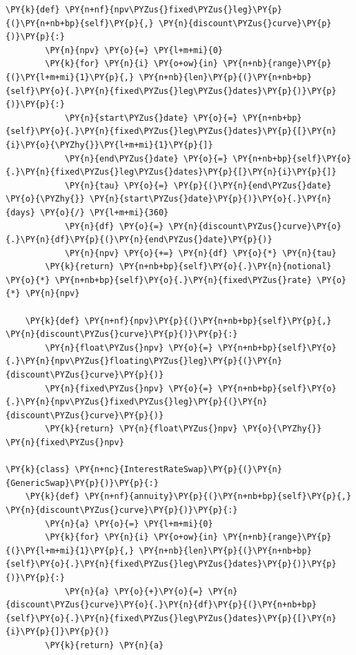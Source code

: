 \begin{tcolorbox}[breakable, size=fbox, boxrule=1pt, pad at break*=1mm,colback=cellbackground, colframe=cellborder]
\begin{Verbatim}[commandchars=\\\{\}]
    \PY{k}{def} \PY{n+nf}{npv\PYZus{}fixed\PYZus{}leg}\PY{p}{(}\PY{n+nb+bp}{self}\PY{p}{,} \PY{n}{discount\PYZus{}curve}\PY{p}{)}\PY{p}{:}
        \PY{n}{npv} \PY{o}{=} \PY{l+m+mi}{0}
        \PY{k}{for} \PY{n}{i} \PY{o+ow}{in} \PY{n+nb}{range}\PY{p}{(}\PY{l+m+mi}{1}\PY{p}{,} \PY{n+nb}{len}\PY{p}{(}\PY{n+nb+bp}{self}\PY{o}{.}\PY{n}{fixed\PYZus{}leg\PYZus{}dates}\PY{p}{)}\PY{p}{)}\PY{p}{:}
            \PY{n}{start\PYZus{}date} \PY{o}{=} \PY{n+nb+bp}{self}\PY{o}{.}\PY{n}{fixed\PYZus{}leg\PYZus{}dates}\PY{p}{[}\PY{n}{i}\PY{o}{\PYZhy{}}\PY{l+m+mi}{1}\PY{p}{]}
            \PY{n}{end\PYZus{}date} \PY{o}{=} \PY{n+nb+bp}{self}\PY{o}{.}\PY{n}{fixed\PYZus{}leg\PYZus{}dates}\PY{p}{[}\PY{n}{i}\PY{p}{]}
            \PY{n}{tau} \PY{o}{=} \PY{p}{(}\PY{n}{end\PYZus{}date} \PY{o}{\PYZhy{}} \PY{n}{start\PYZus{}date}\PY{p}{)}\PY{o}{.}\PY{n}{days} \PY{o}{/} \PY{l+m+mi}{360}
            \PY{n}{df} \PY{o}{=} \PY{n}{discount\PYZus{}curve}\PY{o}{.}\PY{n}{df}\PY{p}{(}\PY{n}{end\PYZus{}date}\PY{p}{)}
            \PY{n}{npv} \PY{o}{+=} \PY{n}{df} \PY{o}{*} \PY{n}{tau}
        \PY{k}{return} \PY{n+nb+bp}{self}\PY{o}{.}\PY{n}{notional} \PY{o}{*} \PY{n+nb+bp}{self}\PY{o}{.}\PY{n}{fixed\PYZus{}rate} \PY{o}{*} \PY{n}{npv}
	
    \PY{k}{def} \PY{n+nf}{npv}\PY{p}{(}\PY{n+nb+bp}{self}\PY{p}{,} \PY{n}{discount\PYZus{}curve}\PY{p}{)}\PY{p}{:}
        \PY{n}{float\PYZus{}npv} \PY{o}{=} \PY{n+nb+bp}{self}\PY{o}{.}\PY{n}{npv\PYZus{}floating\PYZus{}leg}\PY{p}{(}\PY{n}{discount\PYZus{}curve}\PY{p}{)}
        \PY{n}{fixed\PYZus{}npv} \PY{o}{=} \PY{n+nb+bp}{self}\PY{o}{.}\PY{n}{npv\PYZus{}fixed\PYZus{}leg}\PY{p}{(}\PY{n}{discount\PYZus{}curve}\PY{p}{)}
        \PY{k}{return} \PY{n}{float\PYZus{}npv} \PY{o}{\PYZhy{}} \PY{n}{fixed\PYZus{}npv}
	
\PY{k}{class} \PY{n+nc}{InterestRateSwap}\PY{p}{(}\PY{n}{GenericSwap}\PY{p}{)}\PY{p}{:}        
    \PY{k}{def} \PY{n+nf}{annuity}\PY{p}{(}\PY{n+nb+bp}{self}\PY{p}{,} \PY{n}{discount\PYZus{}curve}\PY{p}{)}\PY{p}{:}
        \PY{n}{a} \PY{o}{=} \PY{l+m+mi}{0}
        \PY{k}{for} \PY{n}{i} \PY{o+ow}{in} \PY{n+nb}{range}\PY{p}{(}\PY{l+m+mi}{1}\PY{p}{,} \PY{n+nb}{len}\PY{p}{(}\PY{n+nb+bp}{self}\PY{o}{.}\PY{n}{fixed\PYZus{}leg\PYZus{}dates}\PY{p}{)}\PY{p}{)}\PY{p}{:}
            \PY{n}{a} \PY{o}{+}\PY{o}{=} \PY{n}{discount\PYZus{}curve}\PY{o}{.}\PY{n}{df}\PY{p}{(}\PY{n+nb+bp}{self}\PY{o}{.}\PY{n}{fixed\PYZus{}leg\PYZus{}dates}\PY{p}{[}\PY{n}{i}\PY{p}{]}\PY{p}{)}
        \PY{k}{return} \PY{n}{a}
	

\end{Verbatim}
\end{tcolorbox}
